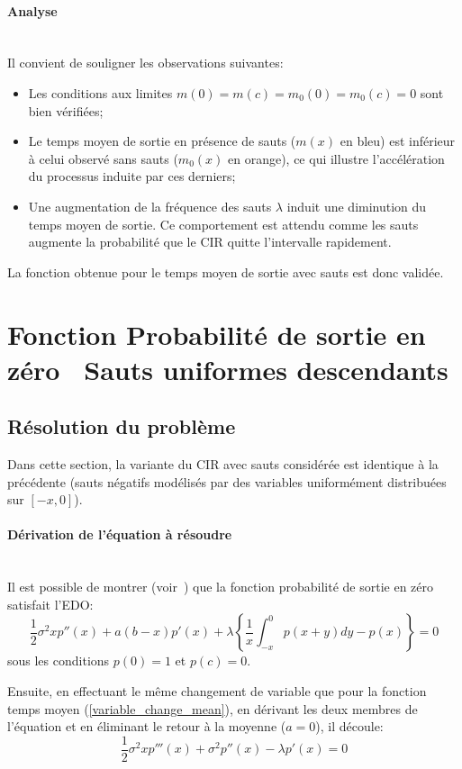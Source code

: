 \FloatBarrier\paragraph{Analyse}\phantom{}\\
Il convient de souligner les observations suivantes:
\begin{itemize}
    \item Les conditions aux limites \( m(0) = m(c) = m_0(0) = m_0(c) = 0 \) sont bien vérifiées;
    \item Le temps moyen de sortie en présence de sauts ($m(x)$ en bleu) est inférieur à celui observé sans sauts ($m_0(x)$ en orange), ce qui illustre l'accélération du processus induite par ces derniers;
    \item Une augmentation de la fréquence des sauts $\lambda$ induit une diminution du temps moyen de sortie. Ce comportement est attendu comme les sauts augmente la probabilité que le \acs{CIR} quitte l'intervalle rapidement.
\end{itemize}
La fonction obtenue pour le temps moyen de sortie avec sauts est donc validée.

\section{Fonction Probabilité de sortie en zéro \textemdash~Sauts uniformes descendants}\label{subsection_probability_jumps}
\subsection{Résolution du problème}
Dans cette section, la variante du \ac{CIR} avec sauts considérée est identique à la précédente (sauts négatifs modélisés par des variables uniformément distribuées sur $[-x,0]$).

\paragraph{Dérivation de l'équation à résoudre}\phantom{}\\
Il est possible de montrer (voir~\cite{lefebvre2007}) que la fonction probabilité de sortie en zéro satisfait l'\acs{EDO}:
\begin{equation}\label{probability_ide}
    \frac{1}{2}\sigma^2xp''(x)+a(b-x)p'(x)+\lambda\left\{\frac{1}{x}\int_{-x}^0p(x+y)dy-p(x)\right\}=0
\end{equation}
sous les conditions $p(0)=1$ et $p(c)=0$.

Ensuite, en effectuant le même changement de variable que pour la fonction temps moyen (\ref{variable_change_mean}), en dérivant les deux membres de l'équation et en éliminant le retour à la moyenne ($a=0$), il découle:
\begin{equation}\label{probability_3rd_order}
    \frac{1}{2}\sigma^2xp'''(x)+\sigma^2p''(x)-\lambda p'(x)=0
\end{equation}
